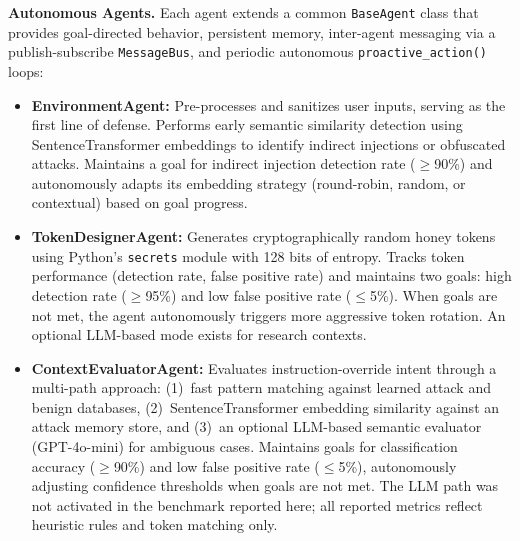\documentclass[manuscript,screen,review]{acmart}
\begin{document}
\textbf{Autonomous Agents.} Each agent extends a common \texttt{BaseAgent} class that provides goal-directed behavior, persistent memory, inter-agent messaging via a publish-subscribe \texttt{MessageBus}, and periodic autonomous \texttt{proactive\_action()} loops:

\begin{itemize}
    \item \textbf{EnvironmentAgent:}
    Pre-processes and sanitizes user inputs, serving as the first line of defense. Performs early semantic similarity detection using SentenceTransformer embeddings to identify indirect injections or obfuscated attacks. Maintains a goal for indirect injection detection rate ($\geq$90\%) and autonomously adapts its embedding strategy (round-robin, random, or contextual) based on goal progress.

    \item \textbf{TokenDesignerAgent:}
    Generates cryptographically random honey tokens using Python's \texttt{secrets} module with 128 bits of entropy. Tracks token performance (detection rate, false positive rate) and maintains two goals: high detection rate ($\geq$95\%) and low false positive rate ($\leq$5\%). When goals are not met, the agent autonomously triggers more aggressive token rotation. An optional LLM-based mode exists for research contexts.

    \item \textbf{ContextEvaluatorAgent:}
    Evaluates instruction-override intent through a multi-path approach: (1)~fast pattern matching against learned attack and benign databases, (2)~SentenceTransformer embedding similarity against an attack memory store, and (3)~an optional LLM-based semantic evaluator (GPT-4o-mini) for ambiguous cases. Maintains goals for classification accuracy ($\geq$90\%) and low false positive rate ($\leq$5\%), autonomously adjusting confidence thresholds when goals are not met. The LLM path was not activated in the benchmark reported here; all reported metrics reflect heuristic rules and token matching only.
\end{itemize}
\end{document}
